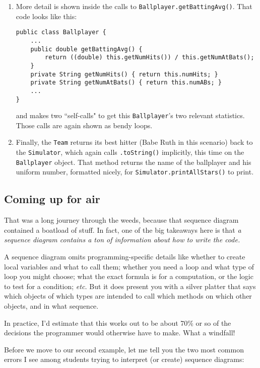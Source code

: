\begin{enumerate}
\item More detail is shown inside the calls to
\texttt{Ballplayer.getBattingAvg()}. That code looks like this:

\begin{Verbatim}[fontsize=\scriptsize,samepage=true,frame=single]
public class Ballplayer {
    ...
    public double getBattingAvg() {
        return ((double) this.getNumHits()) / this.getNumAtBats();
    }
    private String getNumHits() { return this.numHits; }
    private String getNumAtBats() { return this.numABs; }
    ...
}
\end{Verbatim}

and makes two ``self-calls" to get this \texttt{Ballplayer}'s two relevant
statistics. Those calls are again shown as bendy loops.

\item Finally, the \texttt{Team} returns its best hitter (Babe Ruth in this
scenario) back to the \texttt{Simulator}, which again calls
\texttt{.toString()} implicitly, this time on the \texttt{Ballplayer} object.
That method returns the name of the ballplayer and his uniform number,
formatted nicely, for \texttt{Simulator.printAllStars()} to print.

\end{enumerate}

\subsection{Coming up for air}

That was a long journey through the weeds, because that sequence diagram
contained a boatload of stuff. In fact, one of the big takeaways here is that
\textit{a sequence diagram contains a ton of information about how to write
the code.}

A sequence diagram omits programming-specific details like whether to create
local variables and what to call them; whether you need a loop and what type
of loop you might choose; what the exact formula is for a computation, or the
logic to test for a condition; \textit{etc.} But it does present you with a
silver platter that says which objects of which types are intended to call
which methods on which other objects, and in what sequence.

In practice, I'd estimate that this works out to be about 70\% or so of the
decisions the programmer would otherwise have to make. What a windfall!

Before we move to our second example, let me tell you the two most common
errors I see among students trying to interpret (or create) sequence diagrams:

